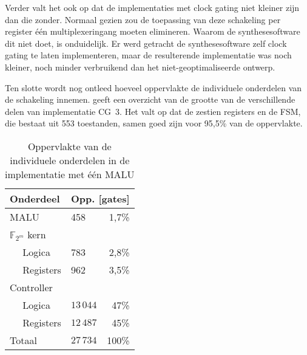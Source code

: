 Verder valt het ook op dat de implementaties met clock gating niet kleiner zijn dan die zonder. Normaal gezien zou de toepassing van deze schakeling per register \'e\'en multiplexeringang moeten elimineren. Waarom de synthesesoftware dit niet doet, is onduidelijk. Er werd getracht de synthesesoftware zelf clock gating te laten implementeren, maar de resulterende implementatie was noch kleiner, noch minder verbruikend dan het niet-geoptimaliseerde ontwerp.


Ten slotte wordt nog ontleed hoeveel oppervlakte de individuele onderdelen van de schakeling innemen.  geeft een overzicht van de grootte van de verschillende delen van implementatie CG~3. Het valt op dat de zestien registers en de FSM, die bestaat uit 553 toestanden, samen goed zijn voor 95,5\% van de oppervlakte.

\begin{table}[h]
	\caption{Oppervlakte van de individuele onderdelen in de implementatie met \'e\'en MALU}
	\label{tabel-resultaten-onderdelen}

	\centering
	\begin{tabular}{llr}
		\toprule
		Onderdeel					& \multicolumn{2}{c}{Opp. [gates]}\\
		\midrule
		MALU				 			& 458			& 1,7\%\\
		$\mathbb{F}_{2^m}$ kern	&				& \\
		$\quad$ Logica				& 783			& 2,8\%\\
		$\quad$ Registers			& 962			& 3,5\%\\
		Controller					&				& \\
		$\quad$ Logica				& $13\,044$	& 47\%\\
		$\quad$ Registers			& $12\,487$	& 45\%\\
		\midrule
		Totaal						& $27\,734$	& 100\%\\
		\bottomrule		
	\end{tabular}
\end{table}


